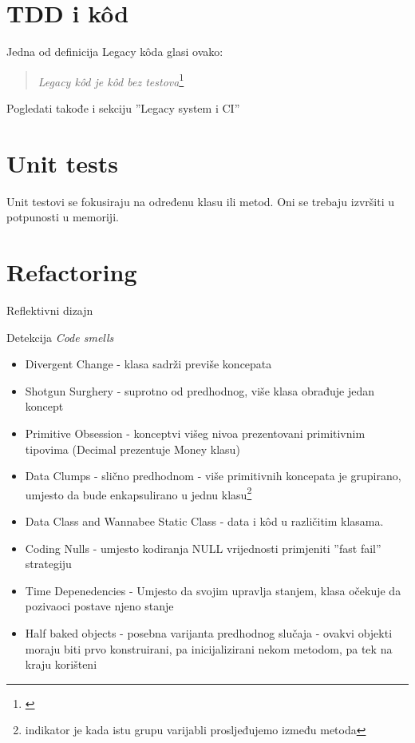\documentclass[times, utf8, seminar]{fit}
\begin{document}
\section{TDD i  k\^od}

Jedna od definicija Legacy k\^oda glasi ovako:
\begin{quote}
  \emph{Legacy k\^od je k\^od bez testova}\footnote{\citep[str. 303]{agileart}}
\end{quote}

Pogledati takođe i sekciju ''Legacy system i CI''\citep[str. 3]{agileci}

\section{Unit tests}

Unit testovi se fokusiraju na određenu klasu ili metod. Oni se trebaju izvršiti u potpunosti u memoriji.\citep[str. 300]{agileart}

\section{Refactoring}

Reflektivni dizajn\citep[str. 306]{agileart}

Detekcija \emph{Code smells}
\begin{itemize}
  \item Divergent Change - klasa sadrži previše koncepata
  \item Shotgun Surghery - suprotno od predhodnog, više klasa obrađuje jedan koncept
  \item Primitive Obsession - konceptvi višeg nivoa prezentovani primitivnim tipovima (Decimal prezentuje Money klasu)
  \item Data Clumps - slično predhodnom - više primitivnih koncepata je grupirano, umjesto da bude enkapsulirano u jednu klasu\footnote{indikator je kada istu grupu varijabli prosljeđujemo između metoda}
  \item Data Class and Wannabee Static Class - data i k\^od u različitim klasama.
  \item Coding Nulls - umjesto kodiranja NULL vrijednosti primjeniti ''fast fail'' strategiju
  \item Time Depenedencies - Umjesto da svojim upravlja stanjem, klasa očekuje da pozivaoci postave njeno stanje
  \item Half baked objects - posebna varijanta predhodnog slučaja - ovakvi objekti moraju biti prvo konstruirani, pa inicijalizirani nekom metodom, pa tek na kraju korišteni 
  
\end{itemize}
\end{document}
